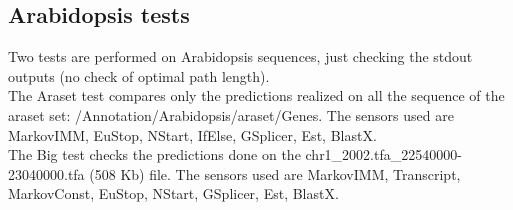 \documentclass[a4paper,11pt]{article}
\begin{document}
\subsection{Arabidopsis tests}
Two tests are performed on Arabidopsis sequences, just checking the stdout outputs (no check of optimal path length).\\
The Araset test compares only the predictions realized on all the sequence of the araset set: /Annotation/Arabidopsis/araset/Genes. The sensors used are MarkovIMM, EuStop, NStart, IfElse, GSplicer, Est, BlastX.\\
The Big test checks the predictions done on the chr1\_2002.tfa\_22540000-23040000.tfa (508 Kb) file. The sensors used are MarkovIMM, Transcript, MarkovConst, EuStop, NStart, GSplicer, Est, BlastX.\\
\end{document}

